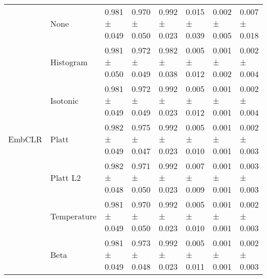 \begin{tabular}{llllllll}
\cline{1-8}
\multirow[t]{7}{*}{EmbCLR} & None & 0.981 ± 0.049 & 0.970 ± 0.050 & 0.992 ± 0.023 & 0.015 ± 0.039 & 0.002 ± 0.005 & 0.007 ± 0.018 \\
 & Histogram & 0.981 ± 0.050 & 0.972 ± 0.049 & 0.982 ± 0.038 & 0.005 ± 0.012 & 0.001 ± 0.002 & 0.002 ± 0.004 \\
 & Isotonic & 0.981 ± 0.049 & 0.972 ± 0.049 & 0.992 ± 0.023 & 0.005 ± 0.012 & 0.001 ± 0.001 & 0.002 ± 0.004 \\
 & Platt & 0.982 ± 0.049 & 0.975 ± 0.047 & 0.992 ± 0.023 & 0.005 ± 0.010 & 0.001 ± 0.001 & 0.002 ± 0.003 \\
 & Platt L2 & 0.982 ± 0.048 & 0.971 ± 0.050 & 0.992 ± 0.023 & 0.007 ± 0.009 & 0.001 ± 0.001 & 0.003 ± 0.003 \\
 & Temperature & 0.981 ± 0.049 & 0.970 ± 0.050 & 0.992 ± 0.023 & 0.005 ± 0.010 & 0.001 ± 0.001 & 0.002 ± 0.003 \\
 & Beta & 0.981 ± 0.049 & 0.973 ± 0.048 & 0.992 ± 0.023 & 0.005 ± 0.011 & 0.001 ± 0.001 & 0.002 ± 0.003 \\
\cline{1-8}
\bottomrule
\end{tabular}
